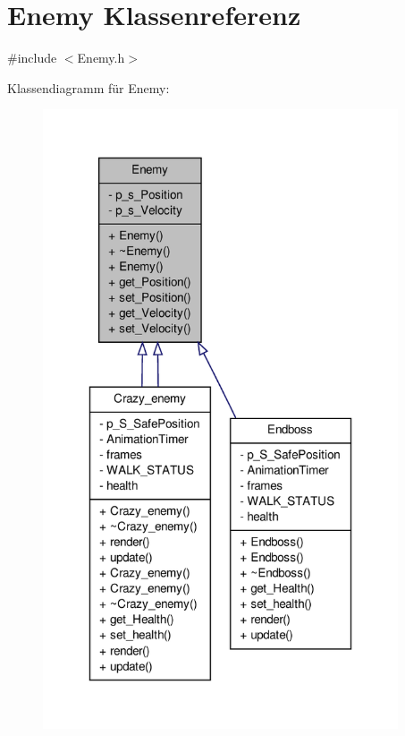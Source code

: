 \hypertarget{class_enemy}{\section{Enemy Klassenreferenz}
\label{class_enemy}
}


{\ttfamily \#include $<$Enemy.\-h$>$}



Klassendiagramm für Enemy\-:
\nopagebreak
\begin{figure}[H]
\begin{center}
\leavevmode
\includegraphics[width=298pt]{class_enemy__inherit__graph}
\end{center}
\end{figure}


